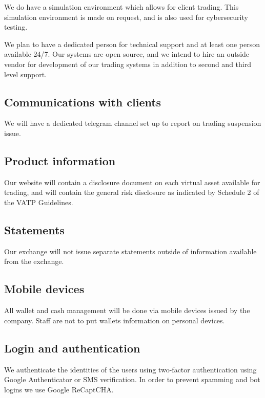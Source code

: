 We do have a simulation environment which allows for client
trading.  This simulation environment is made on request, and is also
used for cybersecurity testing.

We plan to have a dedicated person for technical support and at least
one person available 24/7.  Our systems are open source, and we intend
to hire an outside vendor for development of our trading systems in
addition to second and third level support.

\subsection{Communications with clients}
We will have a dedicated telegram channel set up to report on trading
suspension issue.

\subsection{Product information}
Our website will contain a disclosure document on each virtual asset
available for trading, and will contain the general risk disclosure
as indicated by Schedule 2 of the VATP Guidelines.

\subsection{Statements}
Our exchange will not issue separate statements outside of information
available from the exchange.

\subsection{Mobile devices}
All wallet and cash management will be done via mobile devices issued
by the company.  Staff are not to put wallets information on personal
devices.

\subsection{Login and authentication}

We authenticate the identities of the users using two-factor
authentication using Google Authenticator or SMS verification.  In
order to prevent spamming and bot logins we use Google ReCaptCHA.


